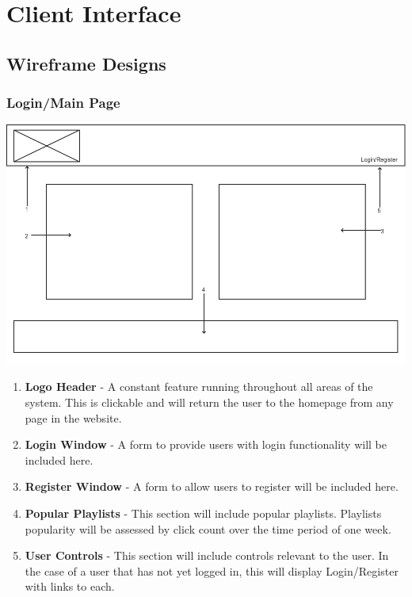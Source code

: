 \documentclass{sig-alt-release2}
\begin{document}
\section{Client Interface}
\subsection{Wireframe Designs}
\subsubsection{Login/Main Page}
\includegraphics[scale=0.3]{img/login}
\begin{enumerate}
\item \textbf{Logo Header} - A constant feature running throughout all areas of the system. This is clickable and will return the user to the homepage from any page in the website.
\item \textbf{Login Window} - A form to provide users with login functionality will be included here.
\item \textbf{Register Window} - A form to allow users to register will be included here.
\item \textbf{Popular Playlists} - This section will include popular playlists. Playlists popularity will be assessed by click count over the time period of one week.
\item \textbf{User Controls} - This section will include controls relevant to the user. In the case of a user that has not yet logged in, this will display Login/Register with links to each.
\end{enumerate}
\end{document}
